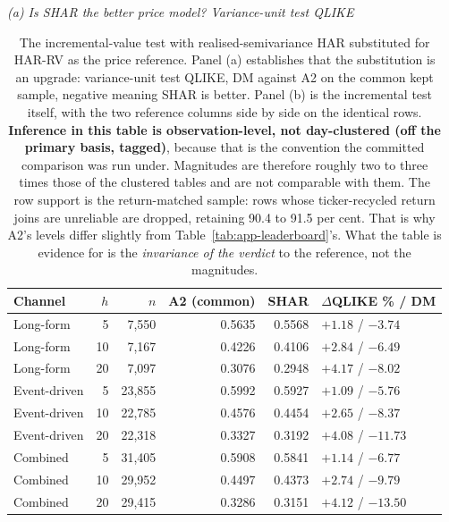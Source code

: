 \begin{table}[htbp]
\centering
\caption[Text's increment against a semivariance-HAR reference]{The
incremental-value test with realised-semivariance HAR
\cite{pattonsheppard2015shar} substituted for HAR-RV as the price
reference. Panel (a) establishes that the substitution is an upgrade:
variance-unit test QLIKE, DM against A2 on the common kept sample, negative
meaning SHAR is better. Panel (b) is the incremental test itself, with the
two reference columns side by side on the identical rows.
\textbf{Inference in this table is observation-level, not day-clustered
(off the primary basis, tagged)}, because that is the convention the
committed comparison was run under. Magnitudes are therefore roughly two to
three times those of the clustered tables and are not comparable with them.
The row support is the return-matched sample: rows whose ticker-recycled
return joins are unreliable are dropped, retaining 90.4 to 91.5 per cent.
That is why A2's levels differ slightly from
Table~\ref{tab:app-leaderboard}'s. What the table is evidence for is the
\emph{invariance of the verdict} to the reference, not the magnitudes.}
\label{tab:app-shar}
\singlespacing\small
\setlength{\tabcolsep}{4pt}

\emph{(a) Is SHAR the better price model? Variance-unit test QLIKE}\\[0.4ex]
\begin{tabular}{@{}lrrrrl@{}}
\toprule
Channel & $h$ & $n$ & A2 (common) & SHAR & $\Delta$QLIKE \% / DM \\
\midrule
Long-form    &  5 & 7{,}550  & 0.5635 & 0.5568 & $+1.18$ / $-3.74$ \\
Long-form    & 10 & 7{,}167  & 0.4226 & 0.4106 & $+2.84$ / $-6.49$ \\
Long-form    & 20 & 7{,}097  & 0.3076 & 0.2948 & $+4.17$ / $-8.02$ \\
Event-driven &  5 & 23{,}855 & 0.5992 & 0.5927 & $+1.09$ / $-5.76$ \\
Event-driven & 10 & 22{,}785 & 0.4576 & 0.4454 & $+2.65$ / $-8.37$ \\
Event-driven & 20 & 22{,}318 & 0.3327 & 0.3192 & $+4.08$ / $-11.73$ \\
Combined     &  5 & 31{,}405 & 0.5908 & 0.5841 & $+1.14$ / $-6.77$ \\
Combined     & 10 & 29{,}952 & 0.4497 & 0.4373 & $+2.74$ / $-9.79$ \\
Combined     & 20 & 29{,}415 & 0.3286 & 0.3151 & $+4.12$ / $-13.50$ \\
\bottomrule
\end{tabular}


\end{table}

